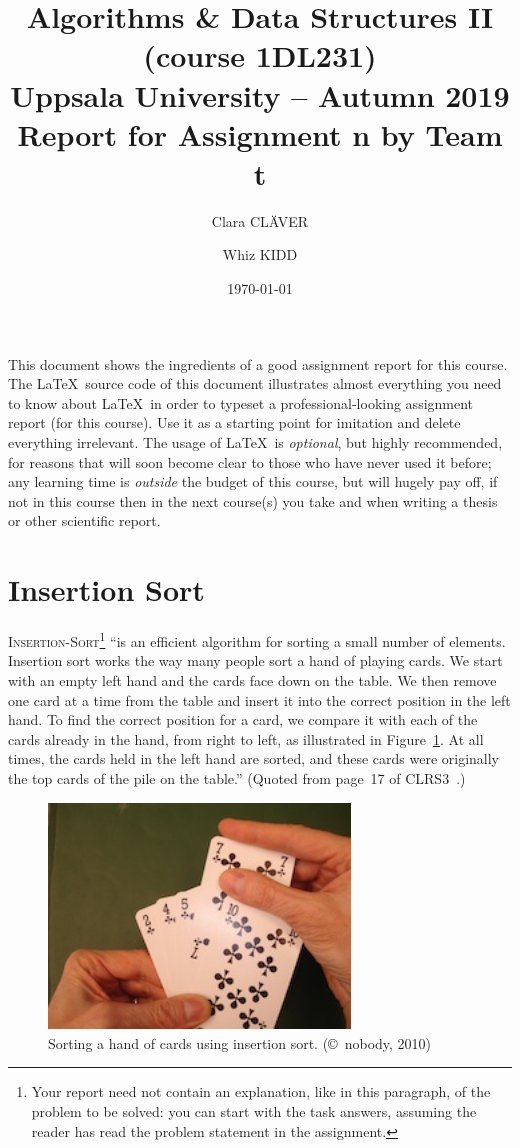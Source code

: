 \documentclass[a4paper,11pt]{article}
\title{\textbf{Algorithms \& Data Structures II (course 1DL231) \\
    Uppsala University -- Autumn 2019 \\
    Report for Assignment n  %
    by Team t}}              %
\author{Clara CLÄVER \and Whiz KIDD}
\date{\today}
\begin{document}
\maketitle

\noindent
This document shows the ingredients of a good assignment report for
this course.  The \LaTeX\ source code of this document illustrates
almost everything you need to know about \LaTeX\ in order to typeset a
professional-looking assignment report (for this course).  Use it as a
starting point for imitation and delete everything irrelevant.  The
usage of \LaTeX\ is \emph{optional}, but highly recommended, for
reasons that will soon become clear to those who have never used it
before; any learning time is \emph{outside} the budget of this course,
but will hugely pay off, if not in this course then in the next
course(s) you take and when writing a thesis or other scientific
report.

\part{Insertion Sort}\label{part:isort}
\setcounter{section}{0} %

\textsc{Insertion-Sort}\footnote{Your report need not contain an
  explanation, like in this paragraph, of the problem to be solved:
  you can start with the task answers, assuming the reader has read
  the problem statement in the assignment.} ``is an efficient
algorithm for sorting a small number of elements.  Insertion sort
works the way many people sort a hand of playing cards.  We start with
an empty left hand and the cards face down on the table.  We then
remove one card at a time from the table and insert it into the
correct position in the left hand.  To find the correct position for a
card, we compare it with each of the cards already in the hand, from
right to left, as illustrated in Figure~\ref{fig:isort}.  At all
times, the cards held in the left hand are sorted, and these cards
were originally the top cards of the pile on the table.'' (Quoted from
page~17 of CLRS3~\cite{CLRS}.)

\begin{figure}[t]  %
  \centering
  \includegraphics[height=6cm]{isort}
  \caption{Sorting a hand of cards using insertion sort.
    (\copyright\ nobody, 2010)}
  \label{fig:isort}
\end{figure}
\end{document}

